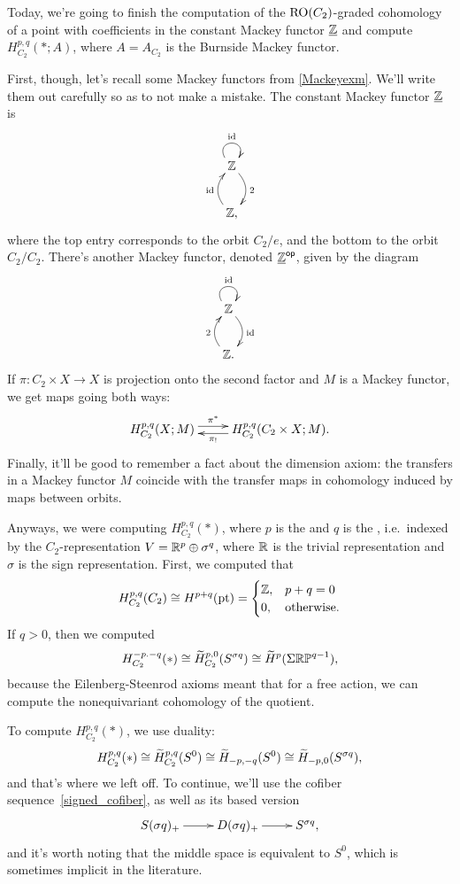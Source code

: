 Today, we're going to finish the computation of the $\mathrm{RO}(C_2)$-graded cohomology of a point with coefficients in
the constant Mackey functor $\underline{\mathbb Z}$ and compute $H_{C_2}^{p,q}(*; A)$, where $A = A_{C_2}$ is the Burnside
Mackey functor.

First, though, let's recall some Mackey functors from \cref{Mackeyexm}. We'll write them out carefully so as to not
make a mistake. The constant Mackey functor $\underline{\mathbb Z}$ is
\[\xymatrix{
	\Z\ar@/^0.4cm/[d]^2\ar@(ul,ur)^\id\\
	\Z,\ar@/^0.4cm/[u]^\id
}\]
where the top entry corresponds to the orbit $C_2/e$, and the bottom to the orbit $C_2/C_2$. There's another Mackey
functor, denoted $\underline{\mathbb Z}^{\mathsf{op}}$, given by the diagram
\[\xymatrix{
	\Z\ar@/^0.4cm/[d]^\id\ar@(ul,ur)^\id\\
	\Z.\ar@/^0.4cm/[u]^2
}\]
If $\pi\colon C_2\times X\to X$ is projection onto the second factor and $M$ is a Mackey functor, we get maps going
both ways:
\[\xymatrix{
	H_{C_2}^{p,q}(X;M)\ar@<0.1cm>[r]^-{\pi^*} & H_{C_2}^{p,q}(C_2\times X; M).\ar@<0.1cm>[l]^-{\pi_!}
}\]
Finally, it'll be good to remember a fact about the dimension axiom: the transfers in a Mackey functor $M$ coincide
with the transfer maps in cohomology induced by maps between orbits.

Anyways, we were computing $H_{C_2}^{p,q}(*)$, where $p$ is the  and $q$ is the , i.e.\ indexed by the $C_2$-representation $V = \mathbb R^p\oplus\sigma^q$, where $\mathbb R$ is the trivial
representation and $\sigma$ is the sign representation. First, we computed that
\[H_{C_2}^{p,q}(C_2)\cong H^{p+q}(\mathrm{pt}) = \begin{cases}
	\mathbb Z, &p+q = 0\\
	0, &\text{otherwise.}
\end{cases}\]
If $q > 0$, then we computed
\[H^{-p.-q}_{C_2}(*) \cong \widetilde H_{C_2}^{p,0}(S^{\sigma q})\cong\widetilde H^p(\Sigma\mathbb{RP}^{q-1}),\]
because the Eilenberg-Steenrod axioms meant that for a free action, we can compute the nonequivariant cohomology of
the quotient.

To compute $H_{C_2}^{p,q}(*)$, we use duality:
\[H_{C_2}^{p,q}(*) \cong \widetilde H^{p,q}_{C_2}(S^0)\cong \widetilde H_{-p,-q}(S^0)\cong \widetilde H_{-p,0}(S^{\sigma q}),\]
and that's where we left off. To continue, we'll use the cofiber sequence~\eqref{signed_cofiber}, as well as its
based version
\begin{equation}
\label{based_signed}
\xymatrix{
	S(\sigma q)_+\ar[r] & D(\sigma q)_+\ar[r] & S^{\sigma q},
}
\end{equation}
and it's worth noting that the middle space is equivalent to $S^0$, which is sometimes implicit in the literature.

